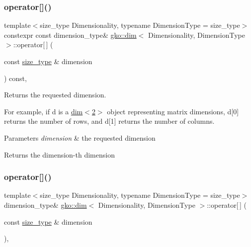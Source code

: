 \subsubsection{\texorpdfstring{operator[]()}{operator[]()}\hspace{0.1cm}{\footnotesize\ttfamily [1/2]}}
{\footnotesize\ttfamily template$<$size\+\_\+type Dimensionality, typename Dimension\+Type = size\+\_\+type$>$ \\
constexpr const dimension\+\_\+type\& \hyperlink{structgko_1_1dim}{gko\+::dim}$<$ Dimensionality, Dimension\+Type $>$\+::operator\mbox{[}$\,$\mbox{]} (\begin{DoxyParamCaption}\item[{const \hyperlink{namespacegko_a6e5c95df0ae4e47aab2f604a22d98ee7}{size\+\_\+type} \&}]{dimension }\end{DoxyParamCaption}) const\hspace{0.3cm}{\ttfamily [inline]}, {\ttfamily [noexcept]}}



Returns the requested dimension. 

For example, if {\ttfamily d} is a \hyperlink{structgko_1_1dim}{dim$<$2$>$} object representing matrix dimensions, {\ttfamily d\mbox{[}0\mbox{]}} returns the number of rows, and {\ttfamily d\mbox{[}1\mbox{]}} returns the number of columns.


\begin{DoxyParams}{Parameters}
{\em dimension} & the requested dimension\\
\hline
\end{DoxyParams}
\begin{DoxyReturn}{Returns}
the {\ttfamily dimension}-\/th dimension 
\end{DoxyReturn}
\mbox{\label{structgko_1_1dim_a02bf1bbda6859052e8b881dfd43b64a9}} 
\subsubsection{\texorpdfstring{operator[]()}{operator[]()}\hspace{0.1cm}{\footnotesize\ttfamily [2/2]}}
{\footnotesize\ttfamily template$<$size\+\_\+type Dimensionality, typename Dimension\+Type = size\+\_\+type$>$ \\
dimension\+\_\+type\& \hyperlink{structgko_1_1dim}{gko\+::dim}$<$ Dimensionality, Dimension\+Type $>$\+::operator\mbox{[}$\,$\mbox{]} (\begin{DoxyParamCaption}\item[{const \hyperlink{namespacegko_a6e5c95df0ae4e47aab2f604a22d98ee7}{size\+\_\+type} \&}]{dimension }\end{DoxyParamCaption})\hspace{0.3cm}{\ttfamily [inline]}, {\ttfamily [noexcept]}}







